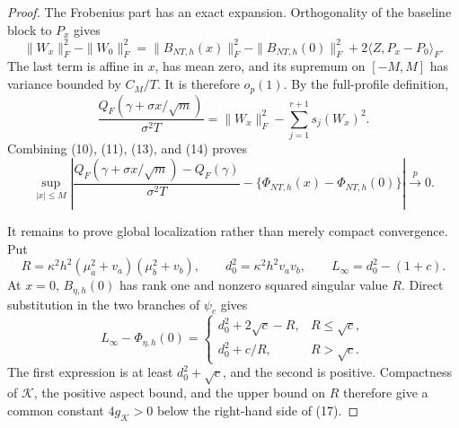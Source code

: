 \documentclass{article}
\begin{document}
\begin{proof}
The Frobenius part has an exact expansion.  Orthogonality of the baseline block to \(P_x\) gives
\[
 \|W_x\|_F^2-\|W_0\|_F^2
 =\|B_{NT,h}(x)\|_F^2-\|B_{NT,h}(0)\|_F^2
 +2\langle Z,P_x-P_0\rangle_F. \tag{14}
\]
The last term is affine in \(x\), has mean zero, and its supremum on \([-M,M]\) has variance bounded by \(C_M/T\).  It is therefore \(o_p(1)\).  By the full-profile definition,
\[
 \frac{Q_F(\gamma+\sigma x/\sqrt m)}{\sigma^2T}
 =\|W_x\|_F^2-\sum_{j=1}^{r+1}s_j(W_x)^2.
\]
Combining (10), (11), (13), and (14) proves
\[
 \sup_{|x|\leq M}\left|
 \frac{Q_F(\gamma+\sigma x/\sqrt m)-Q_F(\gamma)}{\sigma^2T}
 -\{\Phi_{NT,h}(x)-\Phi_{NT,h}(0)\}
 \right|\xrightarrow{p}0. \tag{15}
\]

It remains to prove global localization rather than merely compact convergence.  Put
\[
 R=\kappa^2h^2(\mu_a^2+v_a)(\mu_b^2+v_b),
 \qquad d_0^2=\kappa^2h^2v_av_b,
 \qquad L_\infty=d_0^2-(1+c). \tag{16}
\]
At \(x=0\), \(B_{\eta,h}(0)\) has rank one and nonzero squared singular value \(R\).  Direct substitution in the two branches of \(\psi_c\) gives
\[
 L_\infty-\Phi_{\eta,h}(0)=
 \begin{cases}
 d_0^2+2\sqrt c-R,&R\leq\sqrt c,\\
 d_0^2+c/R,&R>\sqrt c.
 \end{cases} \tag{17}
\]
The first expression is at least \(d_0^2+\sqrt c\), and the second is positive.  Compactness of \(\mathcal K\), the positive aspect bound, and the upper bound on \(R\) therefore give a common constant \(4g_{\mathcal K}>0\) below the right-hand side of (17).


\end{proof}
\end{document}
